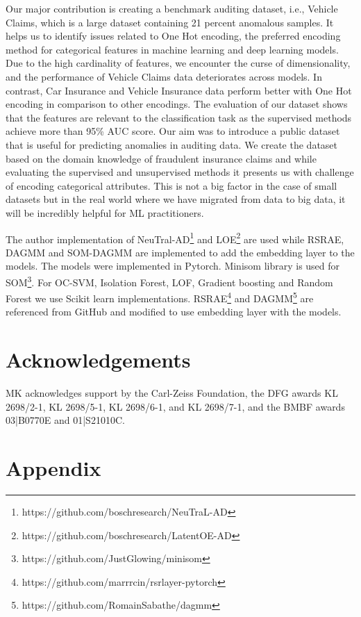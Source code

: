 \documentclass{article}
\begin{document}
Our major contribution is creating a benchmark auditing dataset, i.e., Vehicle Claims, which is a large dataset containing 21 percent anomalous samples. It helps us to identify issues related to One Hot encoding, the preferred encoding method for categorical features in machine learning and deep learning models. Due to the high cardinality of features, we encounter the curse of dimensionality, and the performance of Vehicle Claims data deteriorates across models. In contrast, Car Insurance and Vehicle Insurance data perform better with One Hot encoding in comparison to other encodings. The evaluation of our dataset shows that the features are relevant to the classification task as the supervised methods achieve more than 95\% AUC score. Our aim was to introduce a public dataset that is useful for predicting anomalies in auditing data. We create the dataset based on the domain knowledge of fraudulent insurance claims and while evaluating the supervised and unsupervised methods it presents us with challenge of encoding categorical attributes. This is not a big factor in the case of small datasets but in the real world where we have migrated from data to big data, it will be incredibly helpful for ML practitioners. 

The author implementation of NeuTral-AD\footnote[1]{https://github.com/boschresearch/NeuTraL-AD} and LOE\footnote[2]{https://github.com/boschresearch/LatentOE-AD} are used while RSRAE, DAGMM and SOM-DAGMM are implemented to add the embedding layer to the models. The models were implemented in Pytorch. Minisom library is used for SOM\footnote[3]{https://github.com/JustGlowing/minisom}. For OC-SVM, Isolation Forest, LOF, Gradient boosting and Random Forest we use Scikit learn implementations. RSRAE\footnote[4]{https://github.com/marrrcin/rsrlayer-pytorch} and DAGMM\footnote[5]{https://github.com/RomainSabathe/dagmm} are referenced from GitHub and modified to use embedding layer with the models.

\section{Acknowledgements}
MK acknowledges support by the Carl-Zeiss Foundation, the DFG awards KL 2698/2-1, KL 2698/5-1, KL 2698/6-1, and KL 2698/7-1, and the BMBF awards 03|B0770E and 01|S21010C.



\appendix
\section{Appendix}
\end{document}
